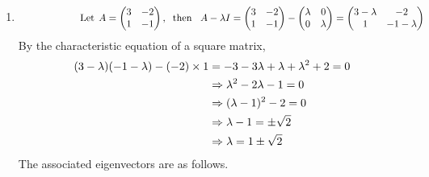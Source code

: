 \documentclass[12pt]{amsart}
\begin{document}
\begin{enumerate}
\begin{enumerate}
			\item 
			\begin{align}
				\hspace{2.16cm} \text{Let} \hspace{0.15cm}  A=
				\begin{pmatrix}
					3 &-2 \\
					1 &-1
				\end{pmatrix}, \hspace{0.2cm} 
				\text{then} \hspace{0.3cm} A-\lambda I=
				\begin{pmatrix}
					3 &-2 \\
					1 &-1
				\end{pmatrix}-
				\begin{pmatrix}
					\lambda &0 \\
					0 &\lambda
				\end{pmatrix}=
				\begin{pmatrix}
					3-\lambda &-2 \\
					1 &-1-\lambda
				\end{pmatrix} \notag
			\end{align}
			By the characteristic equation of a square matrix,
			\begin{align}
				(3-\lambda)(-1-\lambda)-(-2)\times1&=-3-3\lambda+\lambda+\lambda^2+2=0 \notag \\
				&\Rightarrow \lambda^2-2\lambda-1=0 \notag \\
				&\Rightarrow (\lambda-1)^2-2=0 \notag \\
				&\Rightarrow \lambda-1=\pm\sqrt{2} \notag \\
				&\Rightarrow \lambda=1\pm\sqrt{2} \notag
			\end{align}
			The associated eigenvectors are as follows. \\


\end{enumerate}
\end{enumerate}
\end{document}
